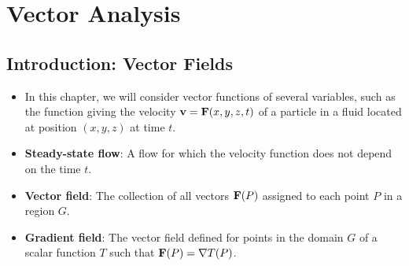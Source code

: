 \documentclass[../main.tex]{subfiles}
\begin{document}
\chapter{Vector Analysis}\label{cht:17}
\section{Introduction: Vector Fields}
\begin{itemize}
    \item {}In this chapter, we will consider vector functions of several variables, such as the function giving the velocity $\vb{v}=\vb{F}(x,y,z,t)$ of a particle in a fluid located at position $(x,y,z)$ at time $t$.
    \item \textbf{Steady-state flow}: A flow for which the velocity function does not depend on the time $t$.
    \item \textbf{Vector field}: The collection of all vectors $\vb{F}(P)$ assigned to each point $P$ in a region $G$.
    \item \textbf{Gradient field}: The vector field defined for points in the domain $G$ of a scalar function $T$ such that $\vb{F}(P)=\nabla T(P)$.
\end{itemize}
\end{document}
